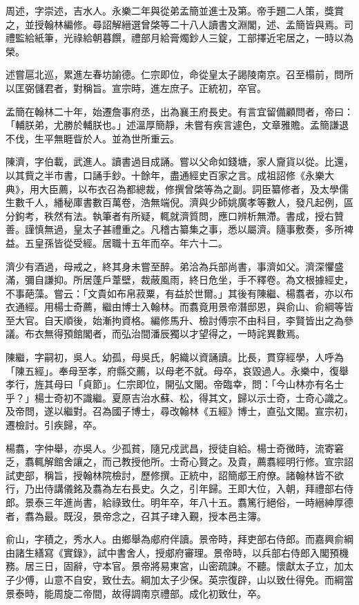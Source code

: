 \begin{pinyinscope}
周述，字崇述，吉水人。永樂二年與從弟孟簡並進士及第。帝手題二人策，獎賞之，並授翰林編修。尋詔解縉選曾棨等二十八人讀書文淵閣，述、孟簡皆與焉。司禮監給紙筆，光祿給朝暮饌，禮部月給膏燭鈔人三錠，工部擇近宅居之，一時以為榮。

述嘗扈北巡，累進左春坊諭德。仁宗即位，命從皇太子謁陵南京。召至榻前，問所以匡弼儲君者，對稱旨。宣宗時，進左庶子。正統初，卒官。

孟簡在翰林二十年，始遷詹事府丞，出為襄王府長史。有言宜留備顧問者，帝曰：「輔朕弟，尤勝於輔朕也。」述溫厚簡靜，未嘗有疾言遽色，文章雅贍。孟簡謙退不伐，生平無睚眥於人。並為世所重云。

陳濟，字伯載，武進人。讀書過目成誦。嘗以父命如錢塘，家人齎貨以從。比還，以其貲之半市書，口誦手鈔。十餘年，盡通經史百家之言。成祖詔修《永樂大典》，用大臣薦，以布衣召為都總裁，修撰曾棨等為之副。詞臣纂修者，及太學儒生數千人，繙秘庫書數百萬卷，浩無端倪。濟與少師姚廣孝等數人，發凡起例，區分鉤考，秩然有法。執筆者有所疑，輒就濟質問，應口辨析無滯。書成，授右贊善。謹慎無過，皇太子甚禮重之。凡稽古纂集之事，悉以屬濟。隨事敷奏，多所裨益。五皇孫皆從受經。居職十五年而卒。年六十二。

濟少有酒過，母戒之，終其身未嘗至醉。弟洽為兵部尚書，事濟如父。濟深懼盛滿，彌自謙抑。所居蓬戶葦壁，裁蔽風雨，終日危坐，手不釋卷。為文根據經史，不事葩藻。嘗云：「文貴如布帛菽粟，有益於世爾。」其後有陳繼、楊翥者，亦以布衣通經。用楊士奇薦，繼由博士入翰林。而翥竟用景帝潛邸恩，與俞山、俞綱等皆至大官。自天順後，始漸拘資格。編修馬升、檢討傅宗不由科目，李賢皆出之為參議。布衣無得預館閣者，而弘治間潘辰獨以才望得之，一時詫異數焉。

陳繼，字嗣初，吳人。幼孤，母吳氏，躬織以資誦讀。比長，貫穿經學，人呼為「陳五經」。奉母至孝，府縣交薦，以母老不就。母卒，哀毀過人。永樂中，復舉孝行，旌其母曰「貞節」。仁宗即位，開弘文閣。帝臨幸，問：「今山林亦有名士乎？」楊士奇初不識繼。夏原吉治水蘇、松，得其文，歸以示士奇，士奇心識之。及帝問，遂以繼對。召為國子博士，尋改翰林《五經》博士，直弘文閣。宣宗初，遷檢討。引疾歸，卒。

楊翥，字仲舉，亦吳人。少孤貧，隨兄戍武昌，授徒自給。楊士奇微時，流寄窘乏，翥輒解館舍讓之，而己教授他所。士奇心賢之。及貴，薦翥經明行修。宣宗詔試吏部，稱旨，授翰林院檢討，歷修撰。正統中，詔簡郕王府僚。諸翰林皆不欲行，乃出侍講儀銘及翥為左右長史。久之，引年歸。王即大位，入朝，拜禮部右侍郎。景泰三年進尚書，給祿致仕。明年卒，年八十五。翥篤行絕俗，一時縉紳厚德者，翥為最。既沒，景帝念之，召其子珒入覲，授本邑主簿。

俞山，字積之，秀水人。由鄉舉為郕府伴讀。景帝時，拜吏部右侍郎。而嘉興俞綱由諸生繕寫《實錄》，試中書舍人，授郕府審理。景帝時，以兵部右侍郎入閣預機務。居三日，固辭，守本官。景帝將易東宮，山密疏諫。不聽。懷獻太子立，加太子少傅，山意不自安，致仕去。綱加太子少保。英宗復辟，山以致仕得免。而綱當景泰時，能周旋二帝間，故得調南京禮部。成化初致仕，卒。


\end{pinyinscope}
